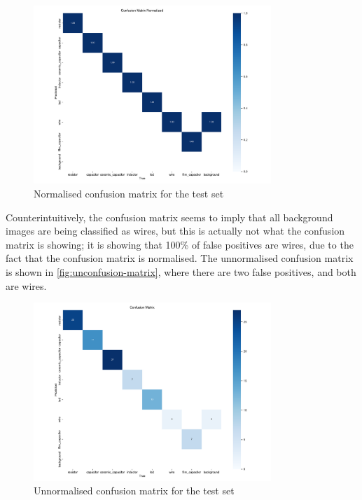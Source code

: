 \begin{figure}[H]
  \centering
  \includegraphics[width=0.8\textwidth]{imgs/graphs/confusion_matrix_test.png}
  \caption{Normalised confusion matrix for the test set}
  \label{fig:confusion-matrix}
\end{figure}

Counterintuitively, the confusion matrix seems to imply that all background images are being classified as wires, but this is actually not what the confusion matrix is showing; it is showing that 100\% of false positives are wires, due to the fact that the confusion matrix is normalised. The unnormalised confusion matrix is shown in \autoref{fig:unconfusion-matrix}, where there are two false positives, and both are wires.

\begin{figure}[H]
    \centering
    \includegraphics[width=0.8\textwidth]{imgs/graphs/unconfusion_matrix_test.png}
    \caption{Unnormalised confusion matrix for the test set}
    \label{fig:unconfusion-matrix}
  \end{figure}


